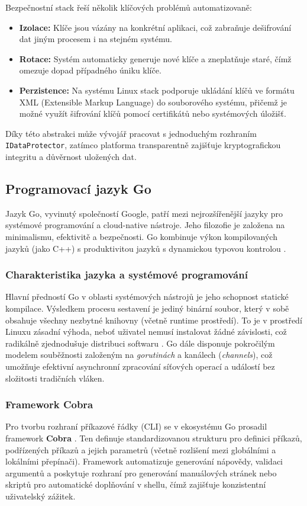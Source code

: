 Bezpečnostní stack řeší několik klíčových problémů automatizovaně:
\begin{itemize}
    \item \textbf{Izolace:} Klíče jsou vázány na konkrétní aplikaci, což zabraňuje dešifrování dat jiným procesem i na stejném systému.
    \item \textbf{Rotace:} Systém automaticky generuje nové klíče a zneplatňuje staré, čímž omezuje dopad případného úniku klíče.
    \item \textbf{Perzistence:} Na systému Linux stack podporuje ukládání klíčů ve formátu XML (Extensible Markup Language) do souborového systému, přičemž je možné využít šifrování klíčů pomocí certifikátů nebo systémových úložišť.
\end{itemize}
Díky této abstrakci může vývojář pracovat s jednoduchým rozhraním \texttt{IDataProtector}, zatímco platforma transparentně zajišťuje kryptografickou integritu a důvěrnost uložených dat.

\subsection{Programovací jazyk Go}
Jazyk Go, vyvinutý společností Google, patří mezi nejrozšířenější jazyky pro systémové programování a cloud-native nástroje. Jeho filozofie je založena na minimalismu, efektivitě a bezpečnosti. Go kombinuje výkon kompilovaných jazyků (jako C++) s produktivitou jazyků s dynamickou typovou kontrolou \cite{go_spec}.

\subsubsection{Charakteristika jazyka a systémové programování}
Hlavní předností Go v oblasti systémových nástrojů je jeho schopnost statické kompilace. Výsledkem procesu sestavení je jediný binární soubor, který v sobě obsahuje všechny nezbytné knihovny (včetně runtime prostředí). To je v prostředí Linuxu zásadní výhoda, neboť uživatel nemusí instalovat žádné závislosti, což radikálně zjednodušuje distribuci softwaru \cite{donovan_go}. Go dále disponuje pokročilým modelem souběžnosti založeným na \textit{gorutinách} a kanálech (\textit{channels}), což umožňuje efektivní asynchronní zpracování síťových operací a událostí bez složitosti tradičních vláken.

\label{sec:cobra}
\subsubsection{Framework Cobra}
Pro tvorbu rozhraní příkazové řádky (CLI) se v ekosystému Go prosadil framework \textbf{Cobra} \cite{cobra_philosophy}. Ten definuje standardizovanou strukturu pro definici příkazů, podřízených příkazů a jejich parametrů (včetně rozlišení mezi globálními a lokálními přepínači). Framework automatizuje generování nápovědy, validaci argumentů a poskytuje rozhraní pro generování manuálových stránek nebo skriptů pro automatické doplňování v shellu, čímž zajišťuje konzistentní uživatelský zážitek.

